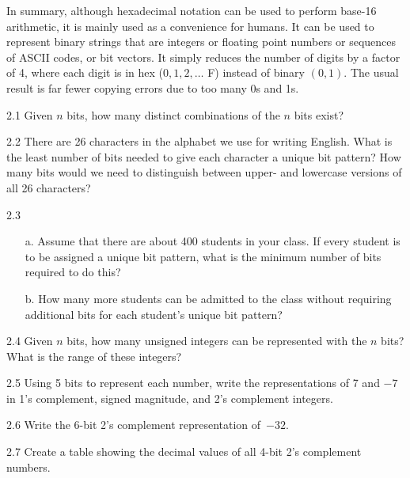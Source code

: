 \documentclass{patt}
\begin{document}
\enlargethispage{-4\baselineskip}

In summary, although hexadecimal notation can be used to perform base-16 
arithmetic, it is mainly used as a convenience
for humans.  It can be used to represent binary strings that are
integers or floating point numbers or sequences of ASCII codes,
or bit vectors.  It simply reduces the number of digits by a
factor of 4, where each digit is in hex ($0,1,2,\ldots$ F)
instead of binary $(0,1)$. The usual result is far fewer
copying errors due to too many 0s and 1s.

\begin{exercises}
\vspace{-12pt}
\item[2.1] Given $n$ bits, how many distinct combinations of the $n$
  bits exist?

\item[2.2] There are 26 characters in the alphabet we use for writing
  English. What is the least number of bits needed to give each
  character a unique bit pattern? How many bits would we need to
  distinguish between upper- and lowercase versions of all 26
  characters?

\item[2.3]
  \begin{enumerate}
  \item[a.] Assume that there are about 400 students in your class.
    If every student is to be assigned a unique bit pattern, what is
    the minimum number of bits required to do this?

  \item[b.] How many more students can be admitted to the class
    without requiring additional bits for each student's unique bit
    pattern?
  \end{enumerate}

\item[2.4] Given $n$ bits, how many unsigned integers can be
  represented with the $n$ bits? What is the range of these integers?

\item[2.5] Using 5 bits to represent each number, write the representations
of 7 and $-7$ in 1's complement,
signed magnitude, and 2's complement integers.

\item[2.6] Write the 6-bit 2's complement representation of~$-32$.

\item[2.7] Create a table showing the decimal values of all
4-bit 2's complement numbers.


\end{exercises}
\end{document}
